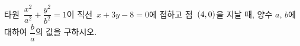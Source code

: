 타원~$\dfrac{x^2}{a^2}+\dfrac{y^2}{b^2}=1$이 직선~$x+3y-8=0$에 접하고 점~$(4{,}\mkern3mu\mathopen{}0)$을 지날 때, 양수 $a$, $b$에 대하여 $\dfrac{b}{a}$의 값을 구하시오.
